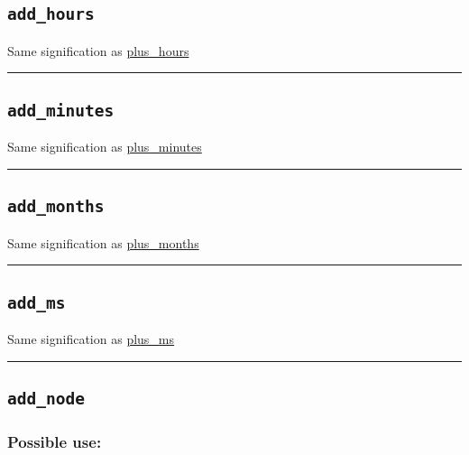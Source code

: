 \documentclass[]{book}
\theoremstyle{definition}
\theoremstyle{definition}
\theoremstyle{definition}
\theoremstyle{remark}
\begin{document}
\subsection{\texorpdfstring{\texttt{add\_hours}}{add\_hours}}\label{add_hours}

Same signification as \href{OperatorsNR\#plus_hours}{plus\_hours}

\begin{center}\rule{0.5\linewidth}{\linethickness}\end{center}

\subsection{\texorpdfstring{\texttt{add\_minutes}}{add\_minutes}}\label{add_minutes}

Same signification as \href{OperatorsNR\#plus_minutes}{plus\_minutes}

\begin{center}\rule{0.5\linewidth}{\linethickness}\end{center}

\subsection{\texorpdfstring{\texttt{add\_months}}{add\_months}}\label{add_months}

Same signification as \href{OperatorsNR\#plus_months}{plus\_months}

\begin{center}\rule{0.5\linewidth}{\linethickness}\end{center}

\subsection{\texorpdfstring{\texttt{add\_ms}}{add\_ms}}\label{add_ms}

Same signification as \href{OperatorsNR\#plus_ms}{plus\_ms}

\begin{center}\rule{0.5\linewidth}{\linethickness}\end{center}

\subsection{\texorpdfstring{\texttt{add\_node}}{add\_node}}\label{add_node}

\subsubsection{Possible use:}\label{possible-use-21}
\end{document}
